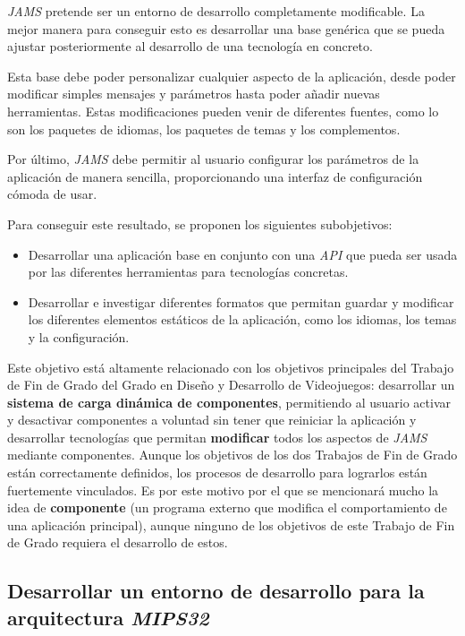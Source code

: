 \textit{JAMS} pretende ser un entorno de desarrollo completamente modificable.
La mejor manera para conseguir esto es desarrollar una base genérica
que se pueda ajustar posteriormente al desarrollo de una tecnología en concreto.

Esta base debe poder personalizar cualquier aspecto de la aplicación,
desde poder modificar simples mensajes y parámetros hasta poder
añadir nuevas herramientas.
Estas modificaciones pueden venir de diferentes fuentes, como lo son
los paquetes de idiomas, los paquetes de temas y los complementos.

Por último, \textit{JAMS} debe permitir al usuario configurar los parámetros
de la aplicación de manera sencilla, proporcionando una interfaz de configuración
cómoda de usar.

Para conseguir este resultado, se proponen los siguientes subobjetivos:
\begin{itemize}
    \item Desarrollar una aplicación base en conjunto con una \textit{API} que pueda
    ser usada por las diferentes herramientas para tecnologías concretas.
    \item Desarrollar e investigar diferentes formatos que permitan guardar
    y modificar los diferentes elementos estáticos de la aplicación, como 
    los idiomas, los temas y la configuración.
\end{itemize}

Este objetivo está altamente relacionado con los
objetivos principales del Trabajo de Fin de Grado del Grado en
Diseño y Desarrollo de Videojuegos: desarrollar un \textbf{sistema de carga
dinámica de componentes}, permitiendo al usuario activar y desactivar
componentes a voluntad sin tener que reiniciar la aplicación y
desarrollar tecnologías que permitan \textbf{modificar}
todos los aspectos de \textit{JAMS} mediante componentes.
Aunque los objetivos de los dos Trabajos de Fin de Grado están
correctamente definidos, los procesos de desarrollo para lograrlos están
fuertemente vinculados.
Es por este motivo por el que se mencionará mucho la idea de \textbf{componente}
(un programa externo que modifica el comportamiento de una aplicación principal),
aunque ninguno de los objetivos de este Trabajo de Fin de Grado requiera el
desarrollo de estos.

\subsection{Desarrollar un entorno de desarrollo para la arquitectura \textit{MIPS32}}
\label{subsec:desarrollar-un-entorno-de-desarrollo-para-la-arquitectura-mips32}

